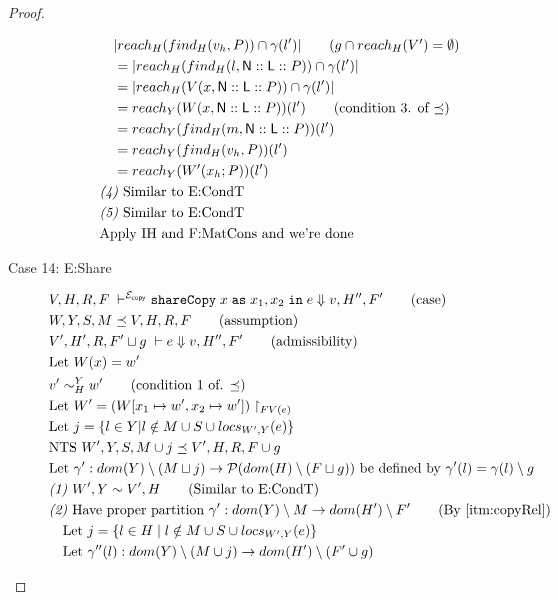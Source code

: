 \documentclass[11pt]{article}
\newcommand{\ms}[1]{\ensuremath{\mathsf{#1}}}
\newcommand{\irl}[1]{\mathtt{#1}}
\newcommand{\sharecpcst}[4]{\irl{shareCopy}\;#1\;\irl{as}\;#2,#3\;\irl{in}\;#4}
\newcommand{\veq}[4]{#3 \sim^{#1}_{#2} #4}
\newcommand{\copySem}{\ensuremath{\mathcal{E}_{\ms{copy}}}}
\theoremstyle{definition}
\begin{document}
\begin{proof}
\begin{description}
\begin{align*}
		&\quad |reach_{H}(find_H(v_h,P)) \cap \gamma(l')| \tag{$g \cap reach_H(V') = \emptyset$}\\
		&\quad = |reach_{H}(find_H(l,\ms{N}::\ms{L}::P)) \cap \gamma(l')|\\
		&\quad = |reach_{H}(V(x,\ms{N}::\ms{L}::P)) \cap \gamma(l')|\\
		&\quad = reach_{Y}(W(x,\ms{N}::\ms{L}::P))(l') \tag{condition 3. of $\preceq$}\\
		&\quad = reach_{Y}(find_H(m,\ms{N}::\ms{L}::P))(l') \\
		&\quad = reach_{Y}(find_H(v_h,P))(l') \\
		&\quad = reach_{Y}(W'(x_h;P))(l') \\
		&\emph{(4) } \text{Similar to E:CondT}\\
		&\emph{(5) } \text{Similar to E:CondT}\\
		&\text{Apply IH and F:MatCons and we're done}
  \end{align*}
  \item[Case 14: E:Share]
	\begin{align*}
		&V,H,R,F \; \vdash^{\copySem} \sharecpcst{x}{x_1}{x_2}{e} \Downarrow v,H'',F' \tag{case}\\
		&W,Y,S,M \preceq V,H,R,F \tag{assumption}\\
		&V',H',R,F' \sqcup g \; \vdash e \Downarrow v,H'',F' \tag{admissibility}\\
		&\text{Let } W(x) = w'\\
		&\veq{Y}{H}{v'}{w'} \tag{condition 1 of. $\preceq$}\\
		&\text{Let } W' = (W[x_1 \mapsto w', x_2 \mapsto w'])\restriction_{FV(e)}\\
		&\text{Let } j = \{l \in Y | l \notin M \cup S \cup locs_{W',Y}(e) \}\\
		&\text{NTS } W',Y,S,M \cup j \preceq V',H,R,F \cup g\\
		&\text{Let } \gamma' : dom(Y) \setminus (M \sqcup j) 
		\to \mathcal{P}(dom(H) \setminus (F \sqcup g)) \text{ be defined by } 
		\gamma'(l) = \gamma(l) \setminus g\\
		&\emph{(1) } W',Y \sim V',H \tag{Similar to E:CondT}\\
		&\emph{(2) } \text{Have proper partition } \gamma' : 
			dom(Y) \setminus M \to dom(H') \setminus F' \tag{By $\ref{itm:copyRel}$}\\
		&\quad \text{Let } j = \{l \in H \mid l \notin M \cup S \cup locs_{W',Y}(e)\}\\
		&\quad \text{Let } \gamma''(l) : dom(Y) \setminus (M \cup j) \to dom(H') \setminus (F' \cup g)

\end{align*}
\end{description}
\end{proof}
\end{document}
